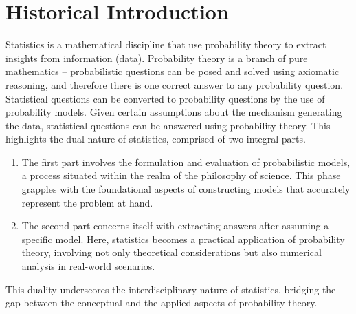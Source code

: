 \chapter{Historical Introduction}
\label{chp:intro}
Statistics is a mathematical discipline that use probability theory to extract insights from information (data). Probability theory is a branch of pure mathematics -- probabilistic questions can be posed and solved using axiomatic reasoning, and therefore there is one correct answer to any probability question. Statistical questions can be converted to probability questions by the use of probability models. Given certain assumptions about the mechanism generating the data, statistical questions can be answered using probability theory. This highlights the dual nature of statistics, comprised of two integral parts.
\begin{enumerate}
	\item The first part involves the formulation and evaluation of probabilistic models, a process situated within the realm of the philosophy of science. This phase grapples with the foundational aspects of constructing models that accurately represent the problem at hand.
	\item The second part concerns itself with extracting answers after assuming a specific model. Here, statistics becomes a practical application of probability theory, involving not only theoretical considerations but also numerical analysis in real-world scenarios.
\end{enumerate}
This duality underscores the interdisciplinary nature of statistics, bridging the gap between the conceptual and the applied aspects of probability theory.\newline

